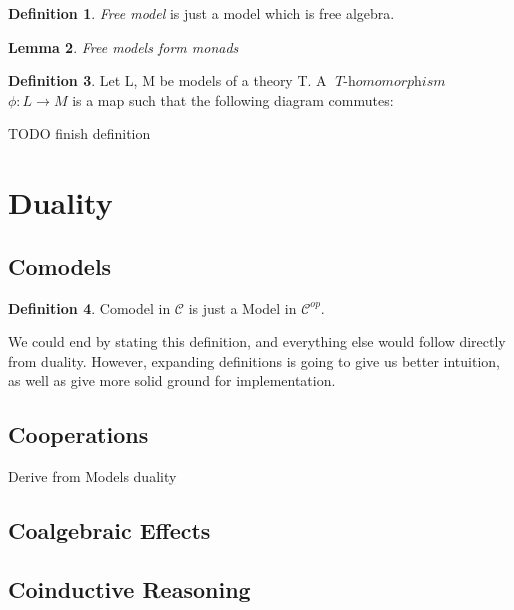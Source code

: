 \documentclass[declaration,shortabstract]{iithesis}
\theoremstyle{definition} \newtheorem{definition}{Definition}[chapter]
\theoremstyle{remark} \newtheorem{remark}[definition]{Observation}
\theoremstyle{plain} \newtheorem{theorem}[definition]{Theorem}
\theoremstyle{plain} \newtheorem{lemma}[definition]{Lemma}
\newcommand{\mathVar}[1]{{\operatorname{\mathit{#1}}}}
\begin{document}
    \begin{definition} \textit{Free model} is just a model which is free algebra.

    \end{definition}

    \begin{lemma}{Free models form monads}

    \end{lemma}

    \begin{definition}

    Let L, M be models of a theory T. A $ \mathVar{T-homomorphism}$
    $\phi : L \rightarrow M$ is a map such that the following diagram commutes:

    TODO finish definition

    \end{definition}

\section{Duality}
    \subsection{Comodels}

    \begin{definition}
        Comodel in $\mathcal{C}$ is just a Model in $ \mathcal{C}^{op} $.
    \end{definition}

    We could end by stating this definition, and everything else would follow
    directly from duality. However, expanding definitions is going to give us
    better intuition, as well as give more solid ground for implementation.

    \subsection{Cooperations}

    Derive from Models duality

    \subsection{Coalgebraic Effects}

    \subsection{Coinductive Reasoning}
\end{document}
